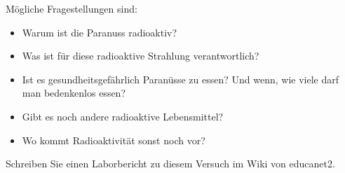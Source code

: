 \documentclass[12pt,a4paper, twosite]{article}
\begin{document}
Mögliche Fragestellungen sind:
\begin{itemize}
	\item Warum ist die Paranuss radioaktiv?
	\item Was ist für diese radioaktive Strahlung verantwortlich?
	\item Ist es gesundheitsgefährlich Paranüsse zu essen? Und wenn, wie viele darf man bedenkenlos essen?
	\item Gibt es noch andere radioaktive Lebensmittel?
	\item Wo kommt Radioaktivität sonst noch vor?
\end{itemize}



Schreiben Sie einen Laborbericht zu diesem Versuch im Wiki von educanet2.
\end{document}
